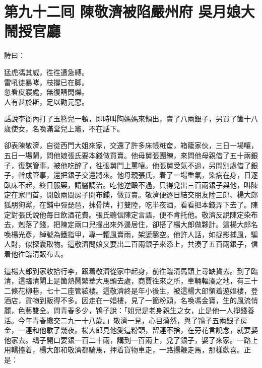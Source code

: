 
\chapter*{第九十二囘 陳敬濟被陷嚴州府 吳月娘大鬧授官廳}


詩曰：

\begin{myquote}
猛虎馮其威，徃徃遭急縛。\\雷吼徒暴哮，枝撐已在脚。\\忽看皮寢處，無復睛閃爍。\\人有甚於斯，足以勸元惡。
\end{myquote}

話說李衙內打了玉簪兒一頓，即時叫陶媽媽來領出，賣了八兩銀子，另買了箇十八歲使女，名喚滿堂兒上竈，不在話下。

卻表陳敬濟，自從西門大姐來家，交還了許多床帳粧奩，箱籠家伙，三日一場嚷，五日一場鬧，問他娘張氏要本錢做買賣。他母舅張團練，來問他母親借了五十兩銀子，復謀管事。被他吃醉了，徃張舅門上罵嚷。{}他張舅受氣不過，另問別處借了銀子，幹成管事，還把銀子交還將來。他母親張氏，着了一場重氣，染病在身，日逐臥床不起，終日服藥，請醫調治。吃他逆毆不過，只得兌出三百兩銀子與他，叫陳定在家門首，開啟兩間房子開布鋪，做買賣。敬濟便逐日結交朋友陸三郎、楊大郎狐朋狗黨，在鋪中彈琵琶，抹骨牌，打雙陸，吃半夜酒，看看把本錢弄下去了。陳定對張氏說他每日飲酒花費。張氏聽信陳定言語，便不肯托他。敬濟反說陳定染布去，剋落了錢，把陳定兩口兒攆出來外邊居住，卻搭了楊大郎做夥計。這楊大郎名喚楊光彥，綽號為鐵指甲，專一糶風賣雨，{}架謊鑿空。他許人話，如捉影捕風，騙人財，似探囊取物。這敬濟問娘又要出二百兩銀子來添上，共湊了五百兩銀子，信着他徃臨清販布去。

這楊大郎到家收拾行李，跟着敬濟從家中起身，前徃臨清馬頭上尋缺貨去。到了臨清，這臨清閘上是箇熱鬧繁華大馬頭去處，商賈徃來之所，車輛輻湊之地，有三十二條花柳巷，七十二座管絃樓。這敬濟終是年小後生，被這楊大郎領着遊娼樓，登酒店，貨物到販得不多。因走在一娼樓，見了一箇粉頭，名喚馮金寶，生的風流俏麗，色藝雙全。問青春多少，鴇子說：「姐兒是老身親生之女，止是他一人掙錢養活。今年青春纔交二九一十八歲。」敬濟一見，心目蕩然，與了鴇子五兩銀子房金，一連和他歇了幾夜。楊大郎見他愛這粉頭，留連不捨，在旁花言說念，就要娶他家去。鴇子開口要銀一百二十兩，講到一百兩上，兌了銀子，娶了來家。一路上用轎擡着，楊大郎和敬濟都騎馬，押着貨物車走，一路揚鞭走馬，那樣歡喜。正是：

